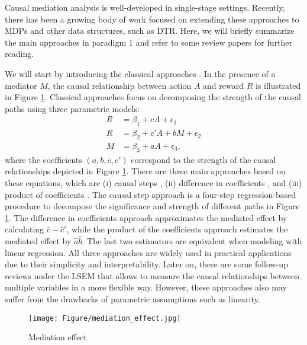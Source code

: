 Causal mediation analysis is well-developed in single-stage settings. Recently, there has been a growing body of work focused on extending these approaches to \acrshort{MDP}s and other data structures, such as \acrshort{DTR}. Here, we will briefly summarize the main approaches in paradigm 1 and refer to some review papers for further reading.



We will start by introducing the classical approaches \citep{mackinnon2007mediation}. In the presence of a mediator $M$, the causal relationship between action $A$ and reward $R$ is illustrated in Figure \ref{fig:mediation_1}. Classical approaches focus on decomposing the strength of the causal paths using three parametric models:
\begin{equation}\label{eq:mediation_2}
    \begin{aligned}
        R &= \beta_1 + cA + \epsilon_1\\
        R & = \beta_2 + c'A + bM +\epsilon_2\\
        M & = \beta_3 + aA +\epsilon_3,
    \end{aligned}
\end{equation}
where the coefficients $(a,b,c,c')$ correspond to the strength of the causal relationships depicted in Figure \ref{fig:mediation_1}. There are three main approaches based on these equations, which are (i) causal steps \citep{baron1986moderator}, (ii) difference in coefficients \citep{mackinnon1993estimating}, and (iii) product of coefficients \citep{alwin1975decomposition}. The causal step approach is a four-step regression-based procedure to decompose the significance and strength of different paths in Figure \ref{fig:mediation_1}. The difference in coefficients approach approximates the mediated effect by calculating $\hat{c}-\hat{c}'$, while the product of the coefficients approach estimates the mediated effect by $\hat{a}\hat{b}$. The last two estimators are equivalent when modeling with linear regression. All three approaches are widely used in practical applications due to their simplicity and interpretability. Later on, there are some follow-up reviews under the \acrfull{LSEM} \citep{hayes2017introduction,bollen1987total,imai2010identification,mackinnon2002comparison,pearl2022direct} that allows to measure the causal relationships between multiple variables in a more flexible way. However, these approaches also may suffer from the drawbacks of parametric assumptions such as linearity.

\begin{figure}[tbh]
    \centering
    \texttt{[image: Figure/mediation\_effect.jpg]}
    \caption{Mediation effect}
    \label{fig:mediation_1}
\end{figure}


